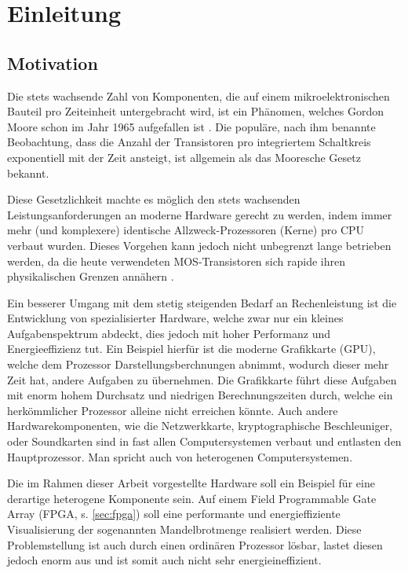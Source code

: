 \documentclass[a4paper,12pt,onesided]{report}
\begin{document}
\newpage
\chapter{Einleitung}
\section{Motivation}
Die stets wachsende Zahl von Komponenten, die auf einem mikroelektronischen Bauteil pro Zeiteinheit untergebracht wird, ist ein Phänomen, welches Gordon Moore schon im Jahr 1965 aufgefallen ist \cite{moore1965cramming}. Die populäre, nach ihm benannte Beobachtung, dass die Anzahl der Transistoren pro integriertem Schaltkreis exponentiell mit der Zeit ansteigt, ist allgemein als das Mooresche Gesetz bekannt.

Diese Gesetzlichkeit machte es möglich den stets wachsenden Leistungsanforderungen an moderne Hardware gerecht zu werden, indem immer mehr (und komplexere) identische Allzweck-Prozessoren (Kerne) pro CPU verbaut wurden.
Dieses Vorgehen kann jedoch nicht unbegrenzt lange betrieben werden, da die heute verwendeten MOS-Transistoren sich rapide ihren physikalischen Grenzen annähern \cite{MOSScaling}.

Ein besserer Umgang mit dem stetig steigenden Bedarf an Rechenleistung ist die Entwicklung von spezialisierter Hardware, welche zwar nur ein kleines Aufgabenspektrum abdeckt, dies jedoch mit hoher Performanz und Energieeffizienz tut.
Ein Beispiel hierfür ist die moderne Grafikkarte (GPU), welche dem Prozessor Darstellungsberchnungen abnimmt, wodurch dieser mehr Zeit hat, andere Aufgaben zu übernehmen. Die Grafikkarte führt diese Aufgaben mit enorm hohem Durchsatz und niedrigen Berechnungszeiten durch, welche ein herkömmlicher Prozessor alleine nicht erreichen könnte.
Auch andere Hardwarekomponenten, wie die Netzwerkkarte, kryptographische Beschleuniger, oder Soundkarten sind in fast allen Computersystemen verbaut und entlasten den Hauptprozessor. Man spricht auch von heterogenen Computersystemen.

Die im Rahmen dieser Arbeit vorgestellte Hardware soll ein Beispiel für eine derartige heterogene Komponente sein. Auf einem Field Programmable Gate Array (FPGA, s. \autoref{sec:fpga}) soll eine performante und energieffiziente Visualisierung der sogenannten Mandelbrotmenge realisiert werden.
Diese Problemstellung ist auch durch einen ordinären Prozessor lösbar, lastet diesen jedoch enorm aus und ist somit auch nicht sehr energieineffizient.
\end{document}

